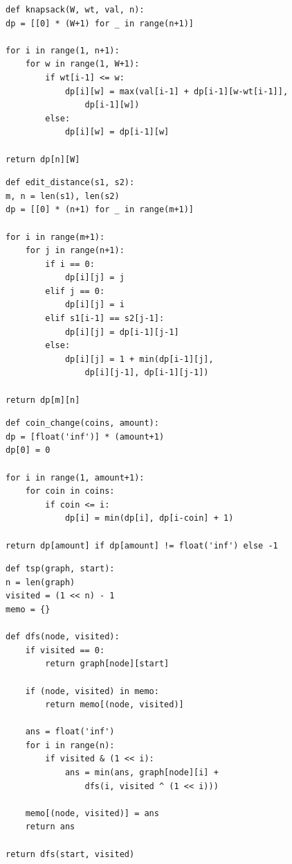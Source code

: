 \documentclass{article}
\begin{document}
\begin{multicols*}{2}
    \lstset{language=python}
    \begin{lstlisting}
def knapsack(W, wt, val, n):
dp = [[0] * (W+1) for _ in range(n+1)]

for i in range(1, n+1):
    for w in range(1, W+1):
        if wt[i-1] <= w:
            dp[i][w] = max(val[i-1] + dp[i-1][w-wt[i-1]],
                dp[i-1][w])
        else:
            dp[i][w] = dp[i-1][w]

return dp[n][W]
\end{lstlisting}

    \begin{lstlisting}
def edit_distance(s1, s2):
m, n = len(s1), len(s2)
dp = [[0] * (n+1) for _ in range(m+1)]

for i in range(m+1):
    for j in range(n+1):
        if i == 0:
            dp[i][j] = j
        elif j == 0:
            dp[i][j] = i
        elif s1[i-1] == s2[j-1]:
            dp[i][j] = dp[i-1][j-1]
        else:
            dp[i][j] = 1 + min(dp[i-1][j],
                dp[i][j-1], dp[i-1][j-1])

return dp[m][n]
\end{lstlisting}

    \begin{lstlisting}
def coin_change(coins, amount):
dp = [float('inf')] * (amount+1)
dp[0] = 0

for i in range(1, amount+1):
    for coin in coins:
        if coin <= i:
            dp[i] = min(dp[i], dp[i-coin] + 1)

return dp[amount] if dp[amount] != float('inf') else -1
\end{lstlisting}

    \begin{lstlisting}
def tsp(graph, start):
n = len(graph)
visited = (1 << n) - 1
memo = {}

def dfs(node, visited):
    if visited == 0:
        return graph[node][start]

    if (node, visited) in memo:
        return memo[(node, visited)]

    ans = float('inf')
    for i in range(n):
        if visited & (1 << i):
            ans = min(ans, graph[node][i] +
                dfs(i, visited ^ (1 << i)))

    memo[(node, visited)] = ans
    return ans

return dfs(start, visited)
\end{lstlisting}

\end{multicols*}
\end{document}
